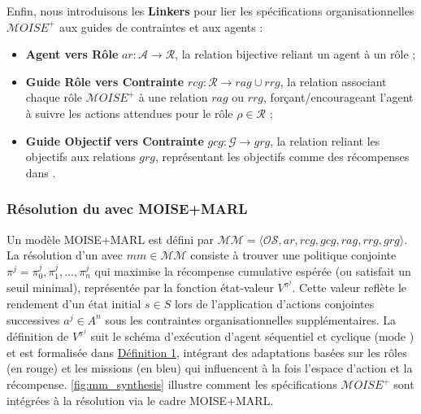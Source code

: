 \noindent Enfin, nous introduisons les \textbf{Linkers} pour lier les spécifications organisationnelles $\mathcal{M}OISE^+$ aux guides de contraintes et aux agents :
%
\begin{itemize}

  \item \textbf{Agent vers Rôle} \quad $ar: \mathcal{A} \to \mathcal{R}$, la relation bijective reliant un agent à un rôle ;
  \item \textbf{Guide Rôle vers Contrainte} \quad $rcg: \mathcal{R} \rightarrow rag \cup rrg$, la relation associant chaque rôle $\mathcal{M}OISE^+$ à une relation $rag$ ou $rrg$, forçant/encourageant l'agent à suivre les actions attendues pour le rôle $\rho \in \mathcal{R}$ ;
  \item \textbf{Guide Objectif vers Contrainte} \quad $gcg: \mathcal{G} \rightarrow grg$, la relation reliant les objectifs aux relations $grg$, représentant les objectifs comme des récompenses dans .
\end{itemize}

\subsubsection*{Résolution du  avec MOISE+MARL}

Un modèle MOISE+MARL est défini par $\mathcal{MM} = \langle \mathcal{OS}, ar, rcg, gcg, rag, rrg, grg \rangle$.
La résolution d'un  avec $mm \in \mathcal{MM}$ consiste à trouver une politique conjointe $\pi^j = {\pi^j_0, \pi^j_1, \dots, \pi^j_n}$ qui maximise la récompense cumulative espérée (ou satisfait un seuil minimal), représentée par la fonction état-valeur $V^{\pi^j}$. Cette valeur reflète le rendement d'un état initial $s \in S$ lors de l'application d'actions conjointes successives $a^j \in A^n$ sous les contraintes organisationnelles supplémentaires.
%
La définition de $V^{\pi^j}$ suit le schéma d'exécution d'agent séquentiel et cyclique (mode ) et est formalisée dans \hyperref[eq:single_value_function]{Définition 1}, intégrant des adaptations basées sur les rôles (en rouge) et les missions (en bleu) qui influencent à la fois l'espace d'action et la récompense.
\autoref{fig:mm_synthesis} illustre comment les spécifications $\mathcal{M}OISE^+$ sont intégrées à la résolution  via le cadre MOISE+MARL.


